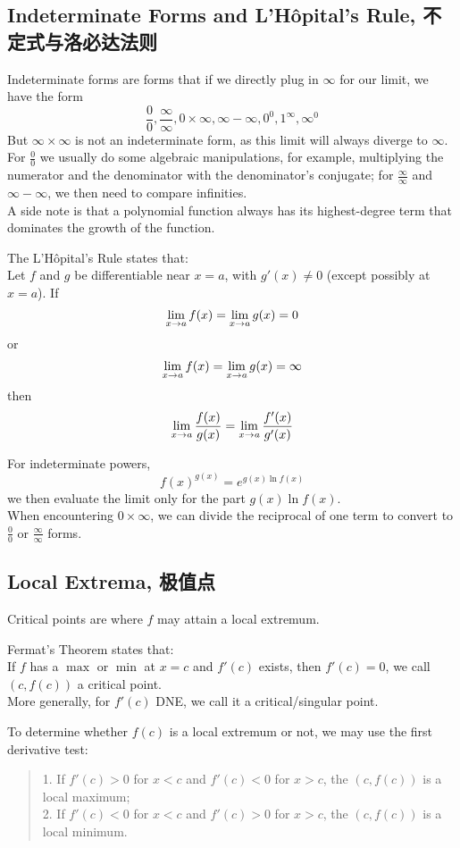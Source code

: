 \subsection{Indeterminate Forms and L'Hôpital's Rule, 不定式与洛必达法则}
Indeterminate forms are forms that if we directly plug in $\infty$ for our limit, we have the form
$$\frac{0}{0}, \frac{\infty}{\infty}, 0 \times \infty, \infty - \infty, 0^0, 1^\infty, \infty^0$$
But $\infty \times \infty$ is not an indeterminate form, as this limit will always diverge to $\infty$. \\
For $\frac{0}{0}$ we usually do some algebraic manipulations, for example, multiplying the numerator and the denominator with the denominator's conjugate; for $\frac{\infty}{\infty}$ and $\infty - \infty$, we then need to compare infinities. \\
A side note is that a polynomial function always has its highest-degree term that dominates the growth of the function.
\begin{theorem}
    The L'Hôpital's Rule states that: \\
    Let $f$ and $g$ be differentiable near $x=a$, with $g'(x) \ne 0$ (except possibly at $x=a$). If
    $$\lim_{x \to a} f(x) = \lim_{x \to a} g(x) = 0$$
    or
    $$\lim_{x \to a} f(x) = \lim_{x \to a} g(x) = \infty$$
    then
    $$\lim_{x \to a} \frac{f(x)}{g(x)} = \lim_{x \to a} \frac{f'(x)}{g'(x)}$$
\end{theorem}
For indeterminate powers,
$$f(x)^{g(x)} = e^{g(x) \ln{f(x)}}$$
we then evaluate the limit only for the part $g(x) \ln{f(x)}$.\\
When encountering $0 \times \infty$, we can divide the reciprocal of one term to convert to $\frac{0}{0}$ or $\frac{\infty}{\infty}$ forms.

\subsection{Local Extrema, 极值点}
Critical points are where $f$ may attain a local extremum.
\begin{theorem}
    Fermat's Theorem states that: \\
    If $f$ has a $\max$ or $\min$ at $x=c$ and $f'(c)$ exists, then $f'(c) = 0$, we call $(c, f(c))$ a critical point. \\
    More generally, for $f'(c)$ DNE, we call it a critical/singular point.
\end{theorem}
To determine whether $f(c)$ is a local extremum or not, we may use the first derivative test:
\begin{quote}
    1. If $f'(c) > 0$ for $x < c$ and $f'(c) < 0$ for $x > c$, the $(c, f(c))$ is a local maximum; \\
    2. If $f'(c) < 0$ for $x < c$ and $f'(c) > 0$ for $x > c$, the $(c, f(c))$ is a local minimum.
\end{quote}

